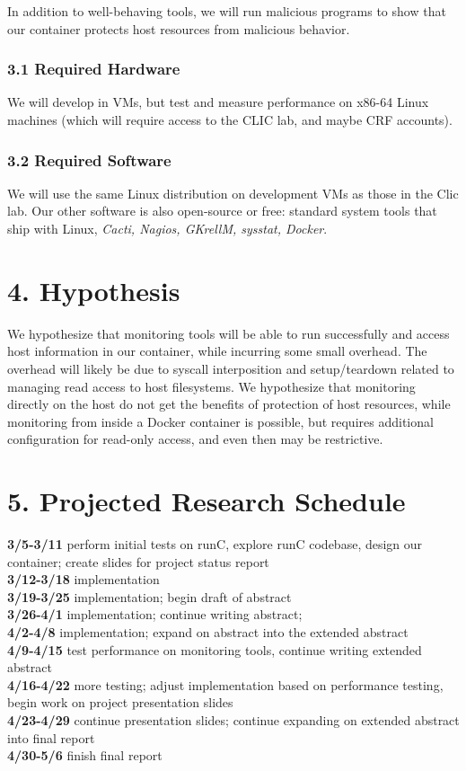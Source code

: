 \documentclass{proc}
\begin{document}
In addition to well-behaving tools, we will run malicious programs to show that our container protects host resources from malicious behavior.

\subsubsection*{3.1 Required Hardware}
We will develop in VMs, but test and measure performance on x86-64 Linux machines (which will require access to the CLIC lab, and maybe CRF accounts).

\subsubsection*{3.2 Required Software}
We will use the same Linux distribution on development VMs as those in the Clic lab. Our other software is also open-source or free: standard system tools that ship with Linux, \emph{Cacti, Nagios, GKrellM, sysstat, Docker}.

\section*{4. Hypothesis}
We hypothesize that monitoring tools will be able to run successfully and access host information in our container, while incurring some small overhead. The overhead will likely be due to syscall interposition and setup/teardown related to managing read access to host filesystems. We hypothesize that monitoring directly on the host do not get the benefits of protection of host resources, while monitoring from inside a Docker container is possible, but requires additional configuration for read-only access, and even then may be restrictive.

\section*{5. Projected Research Schedule}
\textbf{3/5-3/11} perform initial tests on runC, explore runC codebase, design our container; create slides for project status report\\
\textbf{3/12-3/18} implementation\\
\textbf{3/19-3/25} implementation; begin draft of abstract\\
\textbf{3/26-4/1} implementation; continue writing abstract;\\
\textbf{4/2-4/8} implementation; expand on abstract into the extended abstract\\
\textbf{4/9-4/15} test performance on monitoring tools, continue writing extended abstract\\
\textbf{4/16-4/22} more testing; adjust implementation based on performance testing, begin work on project presentation slides\\
\textbf{4/23-4/29} continue presentation slides; continue expanding on extended abstract into final report\\
\textbf{4/30-5/6} finish final report






\end{document}
